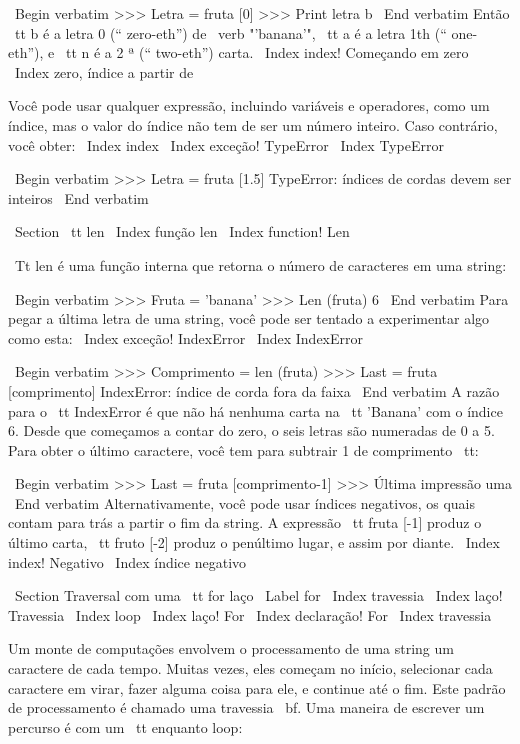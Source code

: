 \documentclass[10pt]{book}
\begin{document}
\begin {itemize}
{{{{\ Begin {verbatim}
>>> Letra = fruta [0]
>>> Print letra
b
\ End {verbatim}
%
Então {\ tt b} é a letra 0 (`` zero-eth'') de \ verb "'banana'", {\ tt a}
é a letra 1th (`` one-eth''), e {\ tt n} é a 2 ª (`` two-eth'')
carta.
\ Index {index! Começando em zero}
\ Index {zero, índice a partir de}

Você pode usar qualquer expressão, incluindo variáveis ​​e operadores, como um
índice, mas o valor do índice não tem de ser um número inteiro. Caso contrário, você
obter:
\ Index {index}
\ Index {exceção! TypeError}
\ Index {} TypeError

\ Begin {verbatim}
>>> Letra = fruta [1.5]
TypeError: índices de cordas devem ser inteiros
\ End {verbatim}
%

\ Section {{\ tt len}}
\ Index {função len}
\ Index {function! Len}

{\ Tt len} é uma função interna que retorna o número de caracteres
em uma string:

\ Begin {verbatim}
>>> Fruta = 'banana'
>>> Len (fruta)
6
\ End {verbatim}
%
Para pegar a última letra de uma string, você pode ser tentado a experimentar algo
como esta:
\ Index {exceção! IndexError}
\ Index {} IndexError

\ Begin {verbatim}
>>> Comprimento = len (fruta)
>>> Last = fruta [comprimento]
IndexError: índice de corda fora da faixa
\ End {verbatim}
%
A razão para o {\ tt IndexError} é que não há nenhuma carta na {\ tt
'Banana'} com o índice 6. Desde que começamos a contar do zero, o
seis letras são numeradas de 0 a 5. Para obter o último caractere, você tem
para subtrair 1 de comprimento {\ tt}:

\ Begin {verbatim}
>>> Last = fruta [comprimento-1]
>>> Última impressão
uma
\ End {verbatim}
%
Alternativamente, você pode usar índices negativos, os quais contam para trás a partir
o fim da string. A expressão {\ tt fruta [-1]} produz o último
carta, {\ tt fruto [-2]} produz o penúltimo lugar, e assim por diante.
\ Index {index! Negativo}
\ Index {índice negativo}


\ Section {Traversal com uma {\ tt for}} laço
\ Label {for}
\ Index {travessia}
\ Index {laço! Travessia}
\ Index {loop}
\ Index {laço! For}
\ Index {declaração! For}
\ Index {travessia}

Um monte de computações envolvem o processamento de uma string um caractere de cada
tempo. Muitas vezes, eles começam no início, selecionar cada caractere em
virar, fazer alguma coisa para ele, e continue até o fim. Este padrão de
processamento é chamado uma travessia {\ bf}. Uma maneira de escrever um percurso
é com um {\ tt enquanto} loop:

}}}}
\end{itemize}
\end{document}
